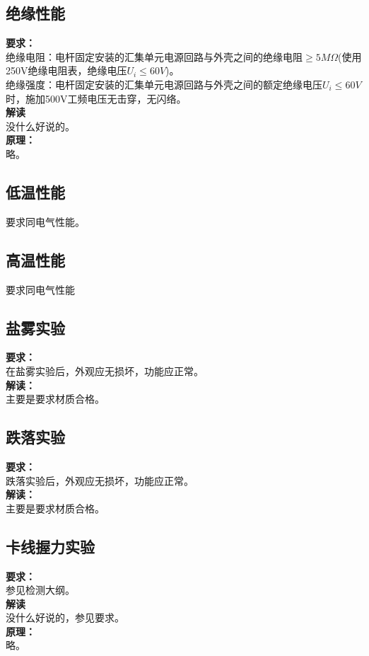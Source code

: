 \documentclass{article}
\begin{document}
\begin{CJK}{UTF8}{gbsn}
\subsection{ 绝缘性能}
	\par
	\textbf{要求：}\\
	绝缘电阻：电杆固定安装的汇集单元电源回路与外壳之间的绝缘电阻$\geq 5M\Omega$(使用250V绝缘电阻表，绝缘电压$U_i\leq 60V$)。\\
	绝缘强度：电杆固定安装的汇集单元电源回路与外壳之间的额定绝缘电压$U_i \leq 60V$时，施加500V工频电压无击穿，无闪络。\\
	\textbf{解读}\\
	没什么好说的。\\
	\textbf{原理：}\\
	略。

\subsection{ 低温性能}
	\par
	要求同电气性能。
\subsection{ 高温性能}
	\par
	要求同电气性能
\subsection{ 盐雾实验}
	\par
	\textbf{要求：}\\
	在盐雾实验后，外观应无损坏，功能应正常。\\
	\textbf{解读：}\\
	主要是要求材质合格。
\subsection{ 跌落实验}
	\par
	\textbf{要求：}\\
	跌落实验后，外观应无损坏，功能应正常。\\
	\textbf{解读：}\\
	主要是要求材质合格。
\subsection{ 卡线握力实验}
	\par
	\textbf{要求：}\\
	参见检测大纲。\\
	\textbf{解读}\\
	没什么好说的，参见要求。\\
	\textbf{原理：}\\
	略。


\end{CJK}
\end{document}

